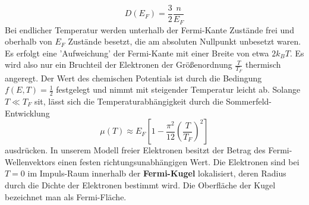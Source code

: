 \documentclass[11pt]{article}
\begin{document}
\begin{equation}
  D(E_F)=\frac{3}{2}\frac{n}{E_F}
\end{equation}
Bei endlicher Temperatur werden unterhalb der Fermi-Kante Zustände frei und
oberhalb von $E_F$ Zustände besetzt, die am absoluten Nullpunkt unbesetzt waren.
Es erfolgt eine 'Aufweichung' der Fermi-Kante mit einer Breite von etwa $2k_BT$.
Es wird also nur ein Bruchteil der Elektronen der Größenordnung $\frac{T}{T_F}$
thermisch angeregt. Der Wert des chemischen Potentials ist durch die Bedingung
$f(E,T)=\frac{1}{2}$ festgelegt und nimmt mit steigender Temperatur leicht ab.
Solange $T\ll T_F$ sit, lässt sich die Temperaturabhängigkeit durch die
Sommerfeld-Entwicklung
\begin{equation}
  \mu(T)\approx E_F\left[1-\frac{\pi^2}{12}\left(\frac{T}{T_F}\right)^2\right]
\end{equation}
ausdrücken. In unserem Modell freier Elektronen besitzt der Betrag des Fermi-
Wellenvektors einen festen richtungsunabhängigen Wert. Die Elektronen sind bei
$T=0$ im Impuls-Raum innerhalb der \textbf{Fermi-Kugel} lokalisiert, deren
Radius durch die Dichte der Elektronen bestimmt wird. Die Oberfläche der Kugel
bezeichnet man als Fermi-Fläche.
\end{document}
